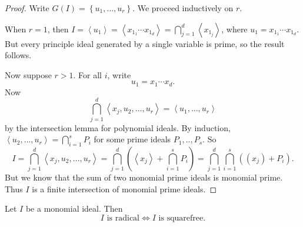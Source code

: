 \documentclass[co439]{subfiles}
\begin{document}
    \begin{proof}
        Write $G\left( I \right) = \left\lbrace u_1,\ldots,u_r \right\rbrace$. We proceed inductively on $r$.

        When $r=1$, then $I = \left< u_1 \right> = \left< x_{1_1}\cdots x_{1_d} \right> = \bigcap^{d}_{j=1} \left< x_{1_j} \right>$, where $u_1 = x_{1_1}\cdots x_{1_d}$. But every principle ideal generated by a single variable is prime, so the result follows.

        Now suppose $r>1$. For all $i$, write
        \begin{equation*}
            u_1 = x_1\cdots x_d.
        \end{equation*}
        Now
        \begin{equation*}
            \bigcap^{d}_{j=1} \left< x_j, u_2, \ldots, u_r \right> = \left< u_1,\ldots,u_r \right>  
        \end{equation*}
        by the intersection lemma for polynomial ideals. By induction, $\left< u_2,\ldots,u_r \right> = \bigcap^{s}_{i=1}P_i$ for some prime ideals $P_1,..,P_s$. So
        \begin{equation*}
            I = \bigcap^{d}_{j=1} \left< x_j, u_2 , \ldots, u_r \right>  = \bigcap^{d}_{j=1} \left( \left< x_j \right> + \bigcap^{s}_{i=1} P_i  \right) = \bigcap^{d}_{j=1} \bigcap^{s}_{i=1} \left( \left( x_j \right)+P_i \right).
        \end{equation*}
        But we know that the sum of two monomial prime ideals is monomial prime. Thus $I$ is a finite intersection of monomial prime ideals.
    \end{proof}
    
    \begin{cor}{}
        Let $I$ be a monomial ideal. Then
        \begin{equation*}
            \text{$I$ is radical}\iff\text{$I$ is squarefree}.
        \end{equation*}
    \end{cor}	
    
\end{document}

